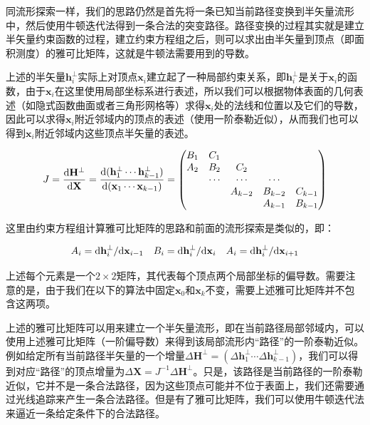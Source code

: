 同流形探索一样，我们的思路仍然是首先将一条已知当前路径变换到半矢量流形中，然后使用牛顿迭代法得到一条合法的突变路径。路径变换的过程其实就是建立半矢量约束函数的过程，建立约束方程组之后，则可以求出由半矢量到顶点（即面积测度）的雅可比矩阵，这就是牛顿法需要用到的导数。

上述的半矢量$\mathbf{h}^{\perp}_{i}$实际上对顶点$\mathbf{x}_i$建立起了一种局部约束关系，即$\mathbf{h}^{\perp}_{i}$是关于$\mathbf{x}_i$的函数，由于$\mathbf{x}_i$在这里使用局部坐标系进行表述，所以我们可以根据物体表面的几何表述（如隐式函数曲面或者三角形网格等）求得$\mathbf{x}_i$处的法线和位置以及它们的导数，因此可以求得$\mathbf{x}_i$附近邻域内的顶点的表述（使用一阶泰勒近似），从而我们也可以得到$\mathbf{x}_i$附近邻域内这些顶点半矢量的表述。

\begin{equation}\label{e:mlt-hslt-jacobian}
	J=\frac{{\rm d}\mathbf{H}^{\perp}}{{\rm d}\mathbf{X}}=\frac{{\rm d}(\mathbf{h}^{\perp}_1\cdots\mathbf{h}^{\perp}_{k-1})}{{\rm d}(\mathbf{x}_1\cdots\mathbf{x}_{k-1})}=\begin{pmatrix}
		B_1 & C_1    &         &         &\\
		A_2 & B_2    &  C_2    &         &\\
		    & \cdots & \cdots  & \cdots  &\\
		    &        & A_{k-2} & B_{k-2} & C_{k-1}\\
		    &        &         & A_{k-1} & B_{k-1}
	\end{pmatrix}
\end{equation}

\noindent 这里由约束方程组计算雅可比矩阵的思路和前面的流形探索是类似的，即：

\begin{equation}
\begin{aligned}
	A_i={\rm d}\mathbf{h}^{\perp}_i/{\rm d}\mathbf{x}_{i-1} && B_i={\rm d}\mathbf{h}^{\perp}_i/{\rm d}\mathbf{x}_i && A_i={\rm d}\mathbf{h}^{\perp}_i/{\rm d}\mathbf{x}_{i+1} 
\end{aligned}
\end{equation}

\noindent 上述每个元素是一个$2\times 2$矩阵，其代表每个顶点两个局部坐标的偏导数。需要注意的是，由于我们在以下的算法中固定$\mathbf{x}_0$和$\mathbf{x}_k$不变，需要上述雅可比矩阵并不包含这两项。

上述的雅可比矩阵可以用来建立一个半矢量流形，即在当前路径局部邻域内，可以使用上述雅可比矩阵（一阶偏导数）来得到该局部流形内“路径”的一阶泰勒近似。例如给定所有当前路径半矢量的一个增量$\Delta\mathbf{H}^{\perp}=(\Delta\mathbf{h}^{\perp}_1\cdots\Delta\mathbf{h}^{\perp}_{k-1})$，我们可以得到对应“路径”的顶点增量为$\Delta\mathbf{X}=J^{-1}\Delta\mathbf{H}^{\perp}$。只是，该路径是当前路径的一阶泰勒近似，它并不是一条合法路径，因为这些顶点可能并不位于表面上，我们还需要通过光线追踪来产生一条合法路径。但是有了雅可比矩阵，我们可以使用牛顿迭代法来逼近一条给定条件下的合法路径。

